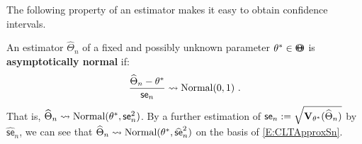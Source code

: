 
The following property of an estimator makes it easy to obtain confidence intervals.
\begin{definition}
An estimator $\widehat{\Theta}_n$ of a fixed and possibly unknown parameter $\theta^* \in {\Theta}\mspace{-11 mu}{\Theta}$ is {\bf asymptotically normal} if:
\begin{equation}\label{E:AsymptoticNormalEstimator}
\frac{\widehat{\Theta}_n - \theta^*}{\mathsf{se}_n} \rightsquigarrow \mbox{{\rm Normal}}(0,1) \ .
\end{equation} 
That is, $\widehat{\Theta}_n \rightsquigarrow \mbox{{\rm Normal}}(\theta^*,\mathsf{se}_n^2)$.  By a further estimation of $\mathsf{se}_n := \sqrt{\mathbf{V}_{\theta^*}(\widehat{\Theta}_n)}$ by $\widehat{\mathsf{se}}_n$, we can see that $\widehat{\Theta}_n \rightsquigarrow \mbox{{\rm Normal}}(\theta^*,\widehat{\mathsf{se}}_n^2)$ on the basis of \eqref{E:CLTApproxSn}.
\end{definition}

